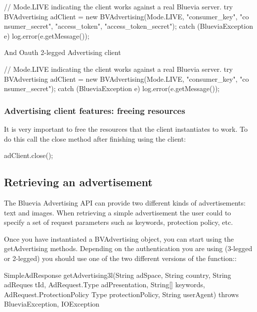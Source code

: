 \begin{DoxyCode}
// Mode.LIVE indicating the client works against a real Bluevia server.
try {
        BVAdvertising adClient = new BVAdvertising(Mode.LIVE, "consumer_key", "co
      nsumer_secret", "access_token", "access_token_secret");
} catch (BlueviaException e){
        log.error(e.getMessage());
}
\end{DoxyCode}


And Oauth 2-\/legged Advertising client


\begin{DoxyCode}
// Mode.LIVE indicating the client works against a real Bluevia server.
try {
        BVAdvertising adClient = new BVAdvertising(Mode.LIVE, "consumer_key", "co
      nsumer_secret");
} catch (BlueviaException e){
        log.error(e.getMessage());
}
\end{DoxyCode}
\hypertarget{blv_ad_guide_adclient_features_freeing_resources_sec}{}\subsubsection{Advertising client features: freeing resources}\label{blv_ad_guide_adclient_features_freeing_resources_sec}
It is very important to free the resources that the client instantiates to work. To do this call the close method after finishing using the client:


\begin{DoxyCode}
adClient.close();
\end{DoxyCode}
\hypertarget{blv_ad_guide_retrieving_simple_ad_sec}{}\subsection{Retrieving an advertisement}\label{blv_ad_guide_retrieving_simple_ad_sec}
The Bluevia Advertising API can provide two different kinds of advertisements: text and images. When retrieving a simple advertisement the user could to specify a set of request parameters such as keywords, protection policy, etc.

Once you have instantiated a BVAdvertising object, you can start using the getAdvertising methods. Depending on the authentication you are using (3-\/legged or 2-\/legged) you should use one of the two different versions of the function::


\begin{DoxyCode}
SimpleAdResponse getAdvertising3l(String adSpace, String country, String adReques
      tId, AdRequest.Type adPresentation, String[] keywords, AdRequest.ProtectionPolicy
      Type protectionPolicy, String userAgent) throws BlueviaException, IOException
\end{DoxyCode}



